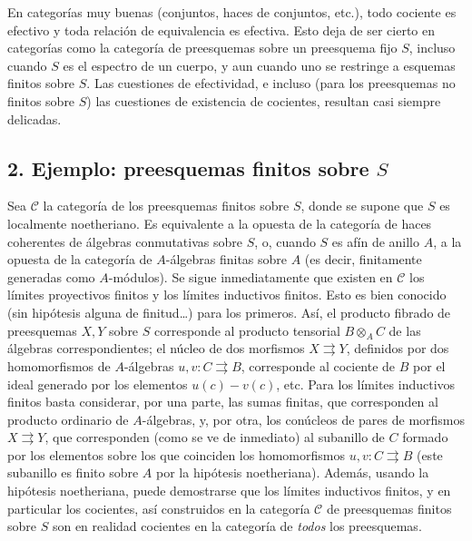 \documentclass[11pt,twoside,openany]{book}
\numberwithin{equation}{section}
\theoremstyle{plain}
\theoremstyle{definition}
\theoremstyle{remark}
\theoremstyle{plain}
\theoremstyle{definition}
\theoremstyle{remark}
\begin{document}
En categorías muy buenas (conjuntos, haces de conjuntos, etc.), todo cociente
es efectivo y toda relación de equivalencia es efectiva. Esto deja de ser
cierto en categorías como la categoría de preesquemas sobre un preesquema fijo
$S$, incluso cuando $S$ es el espectro de un cuerpo, y aun cuando uno se
restringe a esquemas finitos sobre $S$. Las cuestiones de efectividad, e
incluso (para los preesquemas no finitos sobre $S$) las cuestiones de
existencia de cocientes, resultan casi siempre delicadas.

\subsection*{2. Ejemplo: preesquemas finitos sobre $S$}

Sea $\mathcal C$ la categoría de los preesquemas finitos sobre $S$, donde se
supone que $S$ es localmente noetheriano. Es equivalente a la opuesta de la
categoría de haces coherentes de álgebras conmutativas sobre $S$, o, cuando
$S$ es afín de anillo $A$, a la opuesta de la categoría de $A$-álgebras
finitas sobre $A$ (es decir, finitamente generadas como $A$-módulos). Se sigue
inmediatamente que existen en $\mathcal C$ los límites proyectivos finitos y
los límites inductivos finitos. Esto es bien conocido (sin hipótesis alguna
de finitud\ldots) para los primeros. Así, el producto fibrado de preesquemas
$X,Y$ sobre $S$ corresponde al producto tensorial $B\otimes_A C$ de las
álgebras correspondientes; el núcleo de dos morfismos
$X\rightrightarrows Y$, definidos por dos homomorfismos de $A$-álgebras
$u,v:C\rightrightarrows B$, corresponde al cociente de $B$ por el ideal
generado por los elementos $u(c)-v(c)$, etc. Para los límites inductivos
finitos basta considerar, por una parte, las sumas finitas, que corresponden
al producto ordinario de $A$-álgebras, y, por otra, los conúcleos de pares de
morfismos $X\rightrightarrows Y$, que corresponden (como se ve de inmediato)
al subanillo de $C$ formado por los elementos sobre los que coinciden los
homomorfismos $u,v:C\rightrightarrows B$ (este subanillo es finito sobre $A$
por la hipótesis noetheriana). Además, usando la hipótesis noetheriana, puede
demostrarse que los límites inductivos finitos, y en particular los cocientes,
así construidos en la categoría $\mathcal C$ de preesquemas finitos sobre $S$
son en realidad cocientes en la categoría de \emph{todos} los preesquemas.
\end{document}
